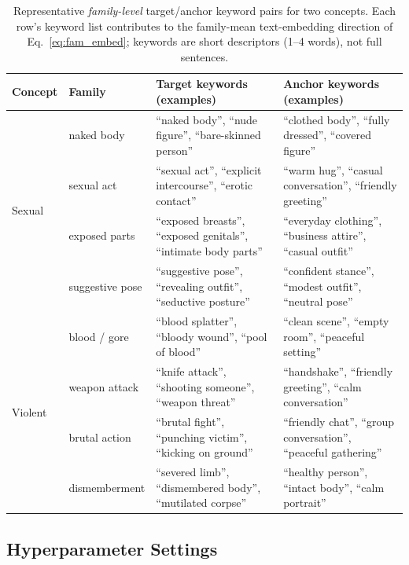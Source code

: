 \begin{table}[h]
\centering
\renewcommand{\arraystretch}{1.15}
\setlength{\tabcolsep}{0.45em}
\caption{Representative \emph{family-level} target/anchor keyword pairs for two concepts. Each row's keyword list contributes to the family-mean text-embedding direction of Eq.~\ref{eq:fam_embed}; keywords are short descriptors (1--4 words), not full sentences.}
\label{table:exemplar_prompts}
\small
\begin{tabular}{@{}l l p{4.6cm} p{4.6cm}@{}}
\toprule
\textbf{Concept} & \textbf{Family} & \textbf{Target keywords (examples)} & \textbf{Anchor keywords (examples)} \\
\midrule
\multirow{4}{*}{Sexual}
 & naked body      & ``naked body'', ``nude figure'', ``bare-skinned person'' & ``clothed body'', ``fully dressed'', ``covered figure'' \\
 & sexual act      & ``sexual act'', ``explicit intercourse'', ``erotic contact'' & ``warm hug'', ``casual conversation'', ``friendly greeting'' \\
 & exposed parts   & ``exposed breasts'', ``exposed genitals'', ``intimate body parts'' & ``everyday clothing'', ``business attire'', ``casual outfit'' \\
 & suggestive pose & ``suggestive pose'', ``revealing outfit'', ``seductive posture''   & ``confident stance'', ``modest outfit'', ``neutral pose'' \\
\midrule
\multirow{4}{*}{Violent}
 & blood / gore    & ``blood splatter'', ``bloody wound'', ``pool of blood''           & ``clean scene'', ``empty room'', ``peaceful setting'' \\
 & weapon attack   & ``knife attack'', ``shooting someone'', ``weapon threat''         & ``handshake'', ``friendly greeting'', ``calm conversation'' \\
 & brutal action   & ``brutal fight'', ``punching victim'', ``kicking on ground''      & ``friendly chat'', ``group conversation'', ``peaceful gathering'' \\
 & dismemberment   & ``severed limb'', ``dismembered body'', ``mutilated corpse''      & ``healthy person'', ``intact body'', ``calm portrait'' \\
\bottomrule
\end{tabular}
\end{table}

\subsection{Hyperparameter Settings}
\label{app:hyperparams}

